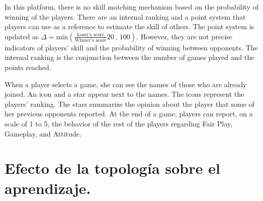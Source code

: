 \documentclass[a4paper,10pt]{book}
\theoremstyle{definition}
\begin{document}
In this platform, there is no skill matching mechanism based on the probability of winning of the players.
There are an internal ranking and a point system that players can use as a reference to estimate the skill of others.
The point system is updated as {\small $\Delta = \text{min}(\frac{\text{Loser's score}}{\text{Winner's score}}20\,,\,100 )$}.
However, they are not precise indicators of players' skill and the probability of winning between opponents.
The internal ranking is the conjunction between the number of games played and the points reached.

When a player selects a game, she can see the names of those who are already joined.
An icon and a star appear next to the names.
The icons represent the players' ranking.
The stars summarize the opinion about the player that some of her previous opponents reported.
At the end of a game, players can report, on a scale of 1 to 5, the behavior of the rest of the players regarding Fair Play, Gameplay, and Attitude.


\chapter{Efecto de la topología sobre el aprendizaje.}
\end{document}
